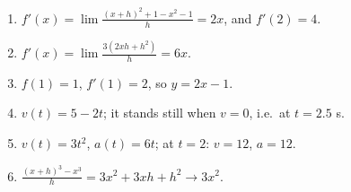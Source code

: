 \begin{enumerate}[label=\textbf{\ansnum.\arabic*}]
  \item $f'(x)=\lim\frac{(x+h)^2+1-x^2-1}{h}=2x$, and $f'(2)=4$.
  \item $f'(x)=\lim\frac{3(2xh+h^2)}{h}=6x$.
  \item $f(1)=1$, $f'(1)=2$, so $y=2x-1$.
  \item $v(t)=5-2t$; it stands still when $v=0$, i.e.\ at $t=2.5$ s.
  \item $v(t)=3t^2$, $a(t)=6t$; at $t=2$: $v=12$, $a=12$.
  \item[\textbf{\ansnum.6}] $\frac{(x+h)^3-x^3}{h}=3x^2+3xh+h^2\to3x^2$.
\end{enumerate}
